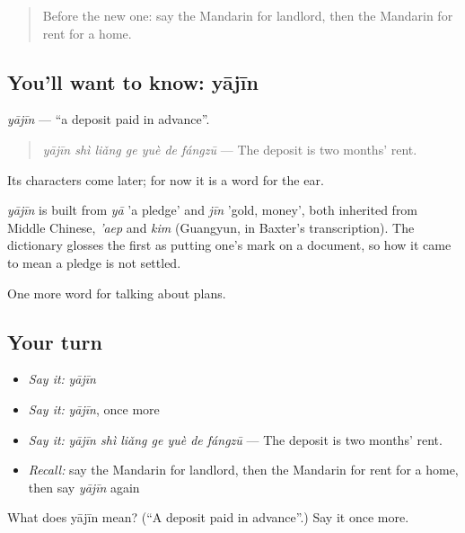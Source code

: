 \begin{quote}
Before the new one: say the Mandarin for landlord, then the Mandarin for rent for a home.
\end{quote}

\subsection*{You'll want to know: yājīn}
\emph{yājīn} — \textquotedblleft{}a deposit paid in advance\textquotedblright{}.

\begin{quote}
\emph{yājīn shì liǎng ge yuè de fángzū} — The deposit is two months' rent.
\end{quote}

Its characters come later; for now it is a word for the ear.

\begin{cousinweb}
\emph{yājīn} is built from \emph{yā} 'a pledge' and \emph{jīn} 'gold, money', both inherited from Middle Chinese, \emph{'aep} and \emph{kim} (Guangyun, in Baxter's transcription). The dictionary glosses the first as putting one's mark on a document, so how it came to mean a pledge is not settled.
\end{cousinweb}

\begin{grammarlens}[title={What you've built}]
One more word for talking about plans.
\end{grammarlens}

\subsection*{Your turn}
\begin{itemize}
\raggedright
  \item \emph{Say it:} \emph{yājīn}
  \item \emph{Say it:} \emph{yājīn}, once more
  \item \emph{Say it:} \emph{yājīn shì liǎng ge yuè de fángzū} — The deposit is two months' rent.
  \item \emph{Recall:} say the Mandarin for landlord, then the Mandarin for rent for a home, then say \emph{yājīn} again
\end{itemize}

\begin{tcolorbox}[breakable,colback=teal!4,colframe=teal!35!black,title={Before you move on}]
What does yājīn mean? (\textquotedblleft{}A deposit paid in advance\textquotedblright{}.) Say it once more.
\end{tcolorbox}
